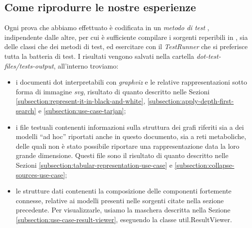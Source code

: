 \subsection{Come riprodurre le nostre esperienze}
Ogni prova che abbiamo effettuato \`e codificata in un \emph{metodo di
  test
}, indipendente dalle altre, per cui \`e sufficiente compilare i
sorgenti reperibili in \cite{MyJavaImpl}, sia delle classi che dei
metodi di test, ed esercitare con il \emph{TestRunner} che si
preferisce tutta la batteria di test. I risultati vengono salvati
nella cartella \emph{dot-test-files/tests-output}, all'interno
troviamo:
\begin{itemize}
\item i documenti dot interpretabili con \emph{graphviz} e le relative
  rappresentazioni sotto forma di immagine \emph{svg}, risultato di
  quanto descritto nelle Sezioni
  \ref{subsection:represent-it-in-black-and-white},
  \ref{subsection:apply-depth-first-search} e
  \ref{subsection:use-case-tarjan};
\item i file testuali contenenti informazioni sulla struttura dei
  grafi riferiti sia a dei modelli ``ad hoc'' riportati anche in
  questo documento, sia a reti metaboliche, delle quali non \`e stato
  possibile riportare una rappresentazione data la loro grande
  dimensione. Questi file sono il risultato di quanto descritto nelle
  Sezioni \ref{subsection:tabular-representation-use-case} e
  \ref{subsection:collapse-sources-use-case};
\item le strutture dati contenenti la composizione delle componenti
  fortemente connesse, relative ai modelli presenti nelle sorgenti
  citate nella sezione precedente. Per visualizzarle, usiamo la
  maschera descritta nella Sezione
  \ref{subsection:use-case-result-viewer}, eseguendo la classe
  util.ResultViewer.
\end{itemize}

